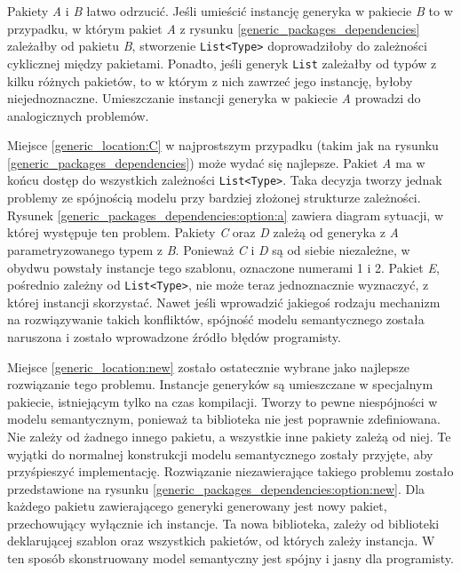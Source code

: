 Pakiety \emph{A} i \emph{B} łatwo odrzucić.
Jeśli umieścić instancję generyka w pakiecie \emph{B} to w przypadku, w którym pakiet \emph{A} z rysunku \ref{generic_packages_dependencies} zależałby od pakietu \emph{B}, stworzenie \lstinline{List<Type>} doprowadziłoby do zależności cyklicznej między pakietami.
Ponadto, jeśli generyk \lstinline{List} zależałby od typów z kilku różnych pakietów, to w którym z nich zawrzeć jego instancję, byłoby niejednoznaczne.
Umieszczanie instancji generyka w pakiecie \emph{A} prowadzi do analogicznych problemów.

Miejsce \ref{generic_location:C} w najprostszym przypadku (takim jak na rysunku \ref{generic_packages_dependencies}) może wydać się najlepsze.
Pakiet \emph{A} ma w końcu dostęp do wszystkich zależności \lstinline{List<Type>}.
Taka decyzja tworzy jednak problemy ze spójnością modelu przy bardziej złożonej strukturze zależności.
Rysunek \ref{generic_packages_dependencies:option:a} zawiera diagram sytuacji, w której występuje ten problem.
Pakiety \emph{C} oraz \emph{D} zależą od generyka z \emph{A} parametryzowanego typem z \emph{B}.
Ponieważ \emph{C} i \emph{D} są od siebie niezależne, w obydwu powstały instancje tego szablonu, oznaczone numerami 1 i 2.
Pakiet \emph{E}, pośrednio zależny od \lstinline{List<Type>}, nie może teraz jednoznacznie wyznaczyć, z której instancji skorzystać.
Nawet jeśli wprowadzić jakiegoś rodzaju mechanizm na rozwiązywanie takich konfliktów, spójność modelu semantycznego została naruszona i zostało wprowadzone źródło błędów programisty.

Miejsce \ref{generic_location:new} zostało ostatecznie wybrane jako najlepsze rozwiązanie tego problemu.
Instancje generyków są umieszczane w specjalnym pakiecie, istniejącym tylko na czas kompilacji.
Tworzy to pewne niespójności w modelu semantycznym, ponieważ ta biblioteka nie jest poprawnie zdefiniowana.
Nie zależy od żadnego innego pakietu, a wszystkie inne pakiety zależą od niej.
Te wyjątki do normalnej konstrukcji modelu semantycznego zostały przyjęte, aby przyśpieszyć implementację.
Rozwiązanie niezawierające takiego problemu zostało przedstawione na rysunku \ref{generic_packages_dependencies:option:new}.
Dla każdego pakietu zawierającego generyki generowany jest nowy pakiet, przechowujący wyłącznie ich instancje.
Ta nowa biblioteka, zależy od biblioteki deklarującej szablon oraz wszystkich pakietów, od których zależy instancja.
W ten sposób skonstruowany model semantyczny jest spójny i jasny dla programisty.

